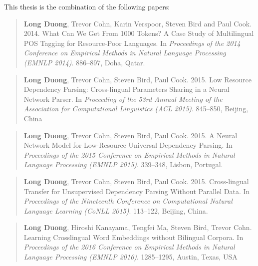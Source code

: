 \newpage

\tableofcontents

\listoffigures
\listoftables




\begin{citations}

\vspace{0.8in}

\ssp
\noindent
This thesis is the combination of the following papers:\\

\begin{quote}
\textbf{Long Duong}, Trevor Cohn, Karin Verspoor, Steven Bird and Paul Cook. 2014. What Can We Get From 1000 Tokens? A Case Study of Multilingual POS Tagging for Resource-Poor Languages. In \textit{Proceedings of the 2014 Conference on Empirical Methods in Natural Language Processing (EMNLP 2014)}. 886--897, Doha, Qatar.
\end{quote}
\begin{quote}
\textbf{Long Duong}, Trevor Cohn, Steven Bird, Paul Cook. 2015. Low Resource Dependency Parsing: Cross-lingual Parameters Sharing in a Neural Network Parser. In\textit{ Proceeding of the 53rd Annual Meeting of the Association for Computational Linguistics (ACL 2015)}.  845--850, Beijing, China
\end{quote}
\begin{quote}
\textbf{Long Duong}, Trevor Cohn, Steven Bird, Paul Cook. 2015. A Neural Network Model for Low-Resource Universal Dependency Parsing. In \textit{Proceedings of the 2015 Conference on Empirical Methods in Natural Language Processing (EMNLP 2015)}. 339--348, Lisbon, Portugal.
\end{quote}
\begin{quote}
\textbf{Long Duong}, Trevor Cohn, Steven Bird, Paul Cook. 2015. Cross-lingual Transfer for Unsupervised Dependency Parsing Without Parallel Data. 
In \textit{Proceedings of the Nineteenth Conference on Computational Natural Language Learning (CoNLL 2015)}. 113--122, Beijing, China. 
\end{quote}
\begin{quote}
\textbf{Long Duong}, Hiroshi Kanayama, Tengfei Ma, Steven Bird, Trevor Cohn. Learning Crosslingual Word Embeddings without Bilingual Corpora. In \textit{Proceedings of the 2016 Conference on Empirical Methods in Natural Language Processing (EMNLP 2016)}. 1285--1295, Austin, Texas, USA

\end{quote}
\end{citations}
